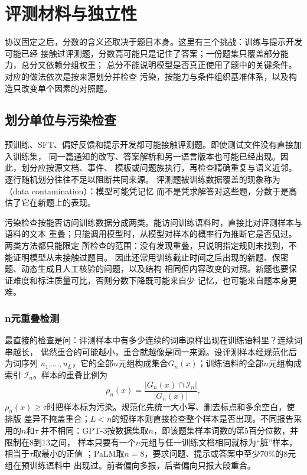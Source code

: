 \section{评测材料与独立性}
\label{sec:nlp-eval-data}

协议固定之后，分数的含义还取决于题目本身。这里有三个挑战：训练与提示开发可能已经
接触过评测题，分数高可能只是记住了答案；一份题集只覆盖部分能力，总分又依赖分组权重；
总分不能说明模型是否真正使用了题中的关键条件。对应的做法依次是按来源划分并检查
污染，按能力与条件组织基准体系，以及构造只改变单个因素的对照题。

\subsection{划分单位与污染检查}
\label{sec:nlp-eval-contamination}

预训练、SFT、偏好反馈和提示开发都可能接触评测题。即使测试文件没有直接加入训练集，
同一篇通知的改写、答案解析和另一语言版本也可能已经出现。因此，划分应按源文档、事件、
模板或问题族执行，再检查精确重复与语义近邻。逐行随机划分往往不足以阻断共同来源。
评测题被训练数据覆盖的现象称为（data contamination）：模型可能凭记忆
而不是凭求解答对这些题，分数于是高估了它在新题上的表现。

污染检查按能否访问训练数据分成两类。能访问训练语料时，直接比对评测样本与语料的文本
重叠；只能调用模型时，从模型对样本的概率行为推断它是否见过。两类方法都只能限定
所检查的范围：没有发现重叠，只说明指定规则未找到，不能证明模型从未接触过题目。
因此还常用训练截止时间之后出现的新题、保密题、动态生成且人工核验的问题，以及结构
相同但内容改变的对照。新题也要保证难度和标注质量可比，否则分数下降既可能来自少
记忆，也可能来自题本身更难。

\subsubsection{n元重叠检测}
\label{sec:nlp-eval-ngram-overlap}

最直接的检查是问：评测样本中有多少连续的词串原样出现在训练语料里？连续词串越长，
偶然重合的可能越小，重合就越像是同一来源。设评测样本经规范化后为词序列
$u_1,\ldots,u_L$，它的全部$n$元组构成集合$G_n(x)$；训练语料的全部$n$元组构成索引
$\mathcal I_n$。样本的重叠比例为
\begin{equation}
 \rho_n(x)=\frac{|G_n(x)\cap\mathcal I_n|}{|G_n(x)|},
 \label{eq:nlp-eval-ngram-overlap}
\end{equation}
$\rho_n(x)\geq\tau$时把样本标为污染。规范化先统一大小写、删去标点和多余空白，使排版
差异不掩盖重合；$L<n$的短样本则直接检查整个样本是否出现。不同报告采用的$n$和$\tau$
并不相同：GPT-3按数据集取$n$，即该题集样本词数的第5百分位数，并限制在8到13之间，
样本只要有一个$n$元组与任一训练文档相同就标为“脏”样本，相当于$\tau$取最小的正值
\cite{brown2020}；PaLM取$n=8$，要求问题、提示或答案中至少$70\%$的8元组在预训练语料中
出现过。前者偏向多报，后者偏向只报大段重合。

